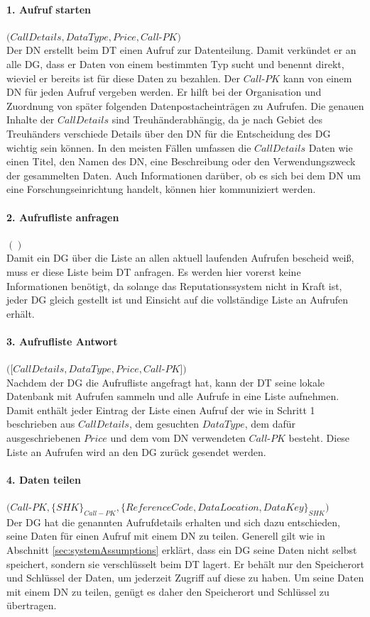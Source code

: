 \documentclass[
	fontsize=11pt,
	headings=small,
	parskip=half,           %
	bibliography=totoc,
	numbers=noenddot,       %
	open=any,               %
]{scrreprt}
\begin{document}
\paragraph{1. Aufruf starten} $(CallDetails, DataType, Price, Call$-$PK)$\\
Der DN erstellt beim DT einen Aufruf zur Datenteilung. Damit verkündet er an alle DG, dass er Daten von einem bestimmten Typ sucht und benennt direkt, wieviel er bereits ist für diese Daten zu bezahlen. Der $Call$-$PK$ kann von einem DN für jeden Aufruf vergeben werden. Er hilft bei der Organisation und Zuordnung von später folgenden Datenpostacheinträgen zu Aufrufen. Die genauen Inhalte der $CallDetails$ sind Treuhänderabhängig, da je nach Gebiet des Treuhänders verschiede Details über den DN für die Entscheidung des DG wichtig sein können. In den meisten Fällen umfassen die $CallDetails$ Daten wie einen Titel, den Namen des DN, eine Beschreibung oder den Verwendungszweck der gesammelten Daten. Auch Informationen darüber, ob es sich bei dem DN um eine Forschungseinrichtung handelt, können hier kommuniziert werden.

\paragraph{2. Aufrufliste anfragen} $()$\\
Damit ein DG über die Liste an allen aktuell laufenden Aufrufen bescheid weiß, muss er diese Liste beim DT anfragen. Es werden hier vorerst keine Informationen benötigt, da solange das Reputationssystem nicht in Kraft ist, jeder DG gleich gestellt ist und Einsicht auf die vollständige Liste an Aufrufen erhält.

\paragraph{3. Aufrufliste Antwort} $([CallDetails, DataType, Price, Call$-$PK])$\\
Nachdem der DG die Aufrufliste angefragt hat, kann der DT seine lokale Datenbank mit Aufrufen sammeln und alle Aufrufe in eine Liste aufnehmen. Damit enthält jeder Eintrag der Liste einen Aufruf der wie in Schritt 1 beschrieben aus $CallDetails$, dem gesuchten $DataType$, dem dafür ausgeschriebenen $Price$ und dem vom DN verwendeten $Call$-$PK$ besteht. Diese Liste an Aufrufen wird an den DG zurück gesendet werden.

\paragraph{4. Daten teilen} $(Call$-$PK, \{SHK\}_{Call-PK}, \{ReferenceCode, DataLocation, DataKey\}_{SHK})$\\
Der DG hat die genannten Aufrufdetails erhalten und sich dazu entschieden, seine Daten für einen Aufruf mit einem DN zu teilen. Generell gilt wie in Abschnitt \ref{sec:systemAssumptions} erklärt, dass ein DG seine Daten nicht selbst speichert, sondern sie verschlüsselt beim DT lagert. Er behält nur den Speicherort und Schlüssel der Daten, um jederzeit Zugriff auf diese zu haben. Um seine Daten mit einem DN zu teilen, genügt es daher den Speicherort und Schlüssel zu übertragen.
\end{document}
